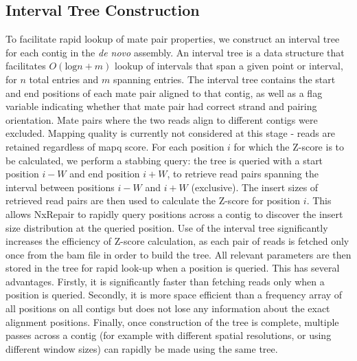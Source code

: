 \documentclass[fleqn,10pt]{wlpeerj}
\begin{document}
\subsection*{Interval Tree Construction}
To facilitate rapid lookup of mate pair properties, we construct an interval tree~\citep{cormen2009} for each contig in the \textit{de novo} assembly. An interval tree is a data structure that facilitates $O(\text{log} n + m)$ lookup of intervals that span a given point or interval, for $n$ total entries and $m$ spanning entries. The interval tree contains the start and end positions of each mate pair aligned to that contig, as well as a flag variable indicating whether that mate pair had correct strand and pairing orientation. Mate pairs where the two reads align to different contigs were excluded. Mapping quality is currently not considered at this stage - reads are retained regardless of mapq score. For each position $i$ for which the Z-score is to be calculated, we perform a stabbing query: the tree is queried with a start position $i-W$ and end position $i+W$, to retrieve read pairs spanning the interval between positions $i-W$ and $i+W$ (exclusive). The insert sizes of retrieved read pairs are then used to calculate the Z-score for position $i$. This allows NxRepair to rapidly query positions across a contig to discover the insert size distribution at the queried position. Use of the interval tree significantly increases the efficiency of Z-score calculation, as each pair of reads is fetched only once from the bam file in order to build the tree. All relevant parameters are then stored in the tree for rapid look-up when a position is queried. This has several advantages. Firstly, it is significantly faster than fetching reads only when a position is queried. Secondly, it is more space efficient than a frequency array of all positions on all contigs but does not lose any information about the exact alignment positions. Finally, once construction of the tree is complete, multiple passes across a contig (for example with different spatial resolutions, or using different window sizes) can rapidly be made using the same tree.      
\end{document}
